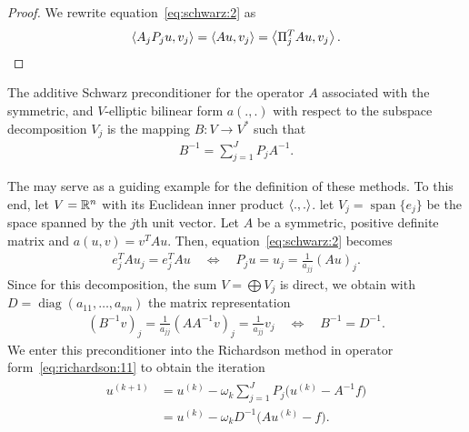 \begin{proof}
  We rewrite equation~\eqref{eq:schwarz:2} as
  \begin{gather}
    \scal(A_j P_j u, v_j) = \scal(A u, v_j) = \scal(\Pi^T_j A u, v_j).
  \end{gather}
\end{proof}

\begin{definition}
  The additive Schwarz preconditioner for the operator $A$ associated
  with the symmetric, and $V$-elliptic bilinear form $a(.,.)$ with
  respect to the subspace decomposition $V_j$ is the mapping $B:
  V \to V^*$ such that
  \begin{gather}
    \label{eq:schwarz:4}
    B^{-1} = \sum_{j=1}^J P_j A^{-1}.
  \end{gather}
\end{definition}

\begin{example}
  \label{example:schwarz:Jacobi}
  The  may serve as a guiding example for the
  definition of these methods. To this end, let $V = \mathbb R^n$ with its
  Euclidean inner product $\scal(.,.)$. let $V_j =
  \operatorname{span}\{e_j\}$ be the space spanned by the $j$th unit
  vector. Let $A$ be a symmetric, positive definite matrix and $a(u,v)
  = v^T A u$. Then, equation~\eqref{eq:schwarz:2} becomes
  \begin{gather}
    \label{eq:schwarz:27}
    e_j^T A u_j = e_j^T A u
    \quad \Leftrightarrow \quad
    P_j u = u_j = \frac1{a_{j j}}(A u)_j.
  \end{gather}
  Since for this decomposition, the sum $V=\bigoplus V_j$ is direct,
  we obtain with $D=\operatorname{diag}(a_{11},\dots,a_{n n})$ the
  matrix representation
  \begin{gather*}
    (B^{-1} v)_j = \frac1{a_{j j}}(A A^{-1} v)_j = \frac1{a_{j j}} v_j
    \quad \Leftrightarrow \quad
    B^{-1} = D^{-1}.
  \end{gather*}
  We enter this preconditioner into the Richardson method in operator
  form~\eqref{eq:richardson:11} to obtain the iteration
  \begin{gather}
    \label{eq:schwarz:28}
    \begin{split}
      u^{(k+1)} &= u^{(k)} - \omega_k \sum_{j=1}^J P_j \bigl(u^{(k)} -
      A^{-1}f\bigr)\\
      &= u^{(k)} - \omega_k D^{-1} \bigl(A u^{(k)} - f\bigr).
    \end{split}
  \end{gather}
\end{example}

